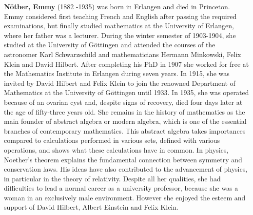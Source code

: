\textbf{Nöther, Emmy} (1882 -1935) was born in Erlangen and died in Princeton. Emmy considered first teaching French and English after passing the required examinations, but finally studied mathematics at the University of Erlangen, where her father was a lecturer. During the winter semester of 1903-1904, she studied at the University of Göttingen and attended the courses of the astronomer Karl Schwarzschild and mathematicians Hermann Minkowski, Felix Klein and David Hilbert. After completing his PhD in 1907 she worked for free at the Mathematics Institute in Erlangen during seven years. In 1915, she was invited by David Hilbert and Felix Klein to join the renowned Department of Mathematics at the University of Göttingen until 1933. In 1935, she was operated because of an ovarian cyst and, despite signs of recovery, died four days later at the age of fifty-three years old. She remains in the history of mathematics as the main founder of abstract algebra or modern algebra, which is one of the essential branches of contemporary mathematics. This abstract algebra takes importances compared to calculations performed in various sets, defined with various operations, and shows what these calculations have in common. In physics, Noether's theorem explains the fundamental connection between symmetry and conservation laws. His ideas have also contributed to the advancement of physics, in particular in the theory of relativity. Despite all her qualities, she had difficulties to lead a normal career as a university professor, because she was a woman in an exclusively male environment. However she enjoyed the esteem and support of David Hilbert, Albert Einstein and Felix Klein.

{}
\label{sec:O}

